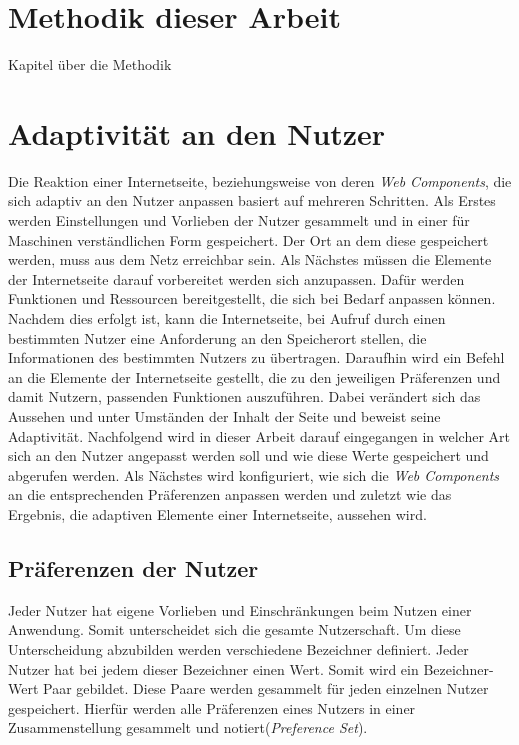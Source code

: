 \documentclass[12pt, paper=a4, bibtotoc, toc=listof, headsepline=true]{scrreprt}
\begin{document}
\chapter{Methodik dieser Arbeit}
Kapitel über die Methodik
\chapter{Adaptivität an den Nutzer}
Die Reaktion einer Internetseite, beziehungsweise von deren \emph{Web Components}, die sich adaptiv an den Nutzer anpassen basiert auf mehreren Schritten. Als Erstes werden Einstellungen und Vorlieben der Nutzer gesammelt und in einer für Maschinen verständlichen Form gespeichert. Der Ort an dem diese gespeichert werden, muss aus dem Netz erreichbar sein. Als Nächstes müssen die Elemente der Internetseite darauf vorbereitet werden sich anzupassen. Dafür werden Funktionen und Ressourcen bereitgestellt, die sich bei Bedarf anpassen können. Nachdem dies erfolgt ist, kann die Internetseite, bei Aufruf durch einen bestimmten Nutzer eine Anforderung an den Speicherort stellen, die Informationen des bestimmten Nutzers zu übertragen. Daraufhin wird ein Befehl an die Elemente der Internetseite gestellt, die zu den jeweiligen Präferenzen und damit Nutzern, passenden Funktionen auszuführen. Dabei verändert sich das Aussehen und unter Umständen der Inhalt der Seite und beweist seine Adaptivität.\newline
Nachfolgend wird in dieser Arbeit darauf eingegangen in welcher Art sich an den Nutzer angepasst werden soll und wie diese Werte gespeichert und abgerufen werden. Als Nächstes wird konfiguriert, wie sich die \emph{Web Components} an die entsprechenden Präferenzen anpassen werden und zuletzt wie das Ergebnis, die adaptiven Elemente einer Internetseite, aussehen wird.
	\section{Präferenzen der Nutzer}
	Jeder Nutzer hat eigene Vorlieben und Einschränkungen beim Nutzen einer Anwendung. Somit unterscheidet sich die gesamte Nutzerschaft. Um diese Unterscheidung abzubilden werden verschiedene Bezeichner definiert. Jeder Nutzer hat bei jedem dieser Bezeichner einen Wert. Somit wird ein Bezeichner-Wert Paar gebildet. Diese Paare werden gesammelt für jeden einzelnen Nutzer gespeichert. Hierfür werden alle Präferenzen eines Nutzers in einer Zusammenstellung gesammelt und notiert(\emph{Preference Set}).
\end{document}
